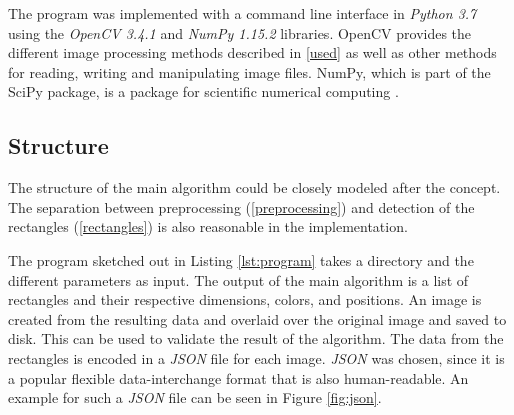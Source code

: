 \documentclass[serif,article,noparskip]{agse-thesis}
\begin{document}
The program was implemented with a command line interface in \textit{Python 3.7}
using the \textit{OpenCV 3.4.1} and \textit{NumPy 1.15.2} libraries. OpenCV
provides the different image processing methods described in \ref{used} as well
as other methods for reading, writing and manipulating image files. NumPy, which
is part of the SciPy package, is a package for scientific numerical computing
\cite{scipy}.

\subsection{Structure} \label{structure}

The structure of the main algorithm could be closely modeled after the concept.
The separation between preprocessing (\ref{preprocessing}) and detection of the
rectangles (\ref{rectangles}) is also reasonable in the implementation.

The program sketched out in Listing \ref{lst:program} takes a directory and the
different parameters as input. The output of the main algorithm is a list of
rectangles and their respective dimensions, colors, and positions. An image is
created from the resulting data and overlaid over the original image and saved
to disk. This can be used to validate the result of the algorithm. The data from
the rectangles is encoded in a \textit{JSON} file for each image. \textit{JSON}
was chosen, since it is a popular flexible data-interchange format that is
also human-readable. An example for such a \textit{JSON} file can be seen in
Figure \ref{fig:json}.
\end{document}
